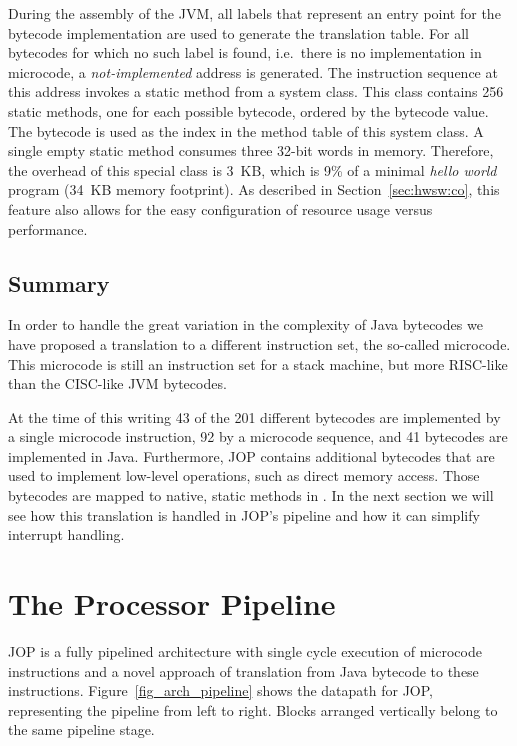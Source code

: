 During the assembly of the JVM, all labels that represent an entry
point for the bytecode implementation are used to generate the
translation table. For all bytecodes for which no such label is
found, i.e.\ there is no implementation in microcode, a
\emph{not-implemented} address is generated. The instruction
sequence at this address invokes a static method from a system
class. This class contains 256 static methods, one for each possible
bytecode, ordered by the bytecode value. The bytecode is used as the
index in the method table of this system class. A single empty
static method consumes three 32-bit words in memory. Therefore, the
overhead of this special class is 3~KB, which is 9\% of a minimal
\emph{hello world} program (34~KB memory footprint). As described in
Section~\ref{sec:hwsw:co}, this feature also allows for the easy
configuration of resource usage versus performance.

\subsection{Summary}

In order to handle the great variation in the complexity of Java
bytecodes we have proposed a translation to a different instruction
set, the so-called microcode. This microcode is still an instruction
set for a stack machine, but more RISC-like than the CISC-like JVM
bytecodes.

At the time of this writing 43 of the 201 different bytecodes are
implemented by a single microcode instruction, 92 by a microcode
sequence, and 41 bytecodes are implemented in Java. Furthermore, JOP
contains additional bytecodes that are used to implement low-level
operations, such as direct memory access. Those bytecodes are mapped
to native, static methods in . In the
next section we will see how this translation is handled in JOP's
pipeline and how it can simplify interrupt handling.


\section{The Processor Pipeline}
\label{sec:pipeline}

JOP is a fully pipelined architecture with single cycle execution of
microcode instructions and a novel approach of translation from Java
bytecode to these instructions. Figure~\ref{fig_arch_pipeline} shows
the datapath for JOP, representing the pipeline from left to right.
Blocks arranged vertically belong to the same pipeline stage.

